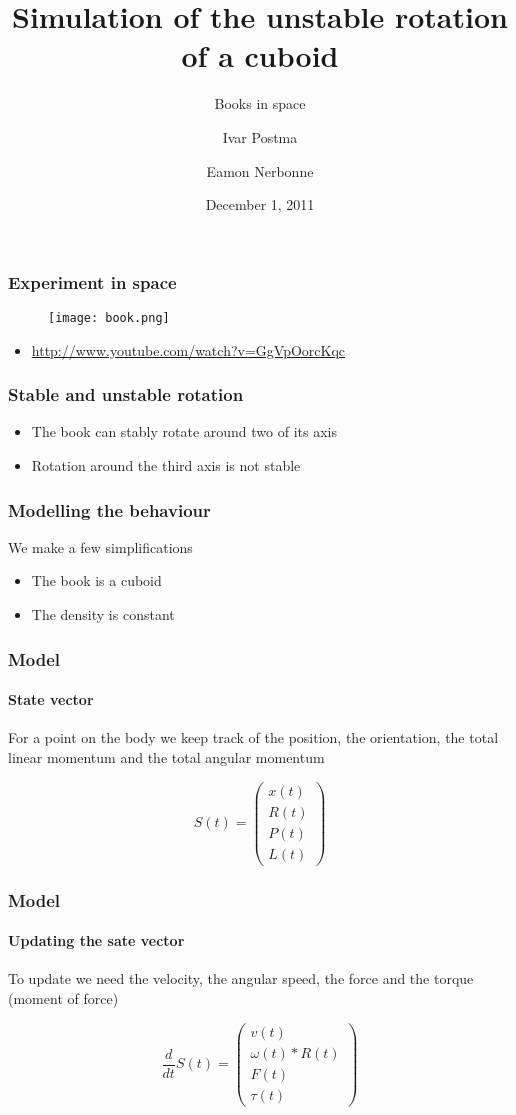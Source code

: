 \documentclass{beamer}
\title{Simulation of the unstable rotation of a cuboid}
\subtitle{Books in space}
\author{Ivar Postma \and Eamon Nerbonne}
\institute[University of Groningen]
{
  Introduction to Computational Science \\
  School for Computing and Cognition \\
  University of Groningen
}
\date{December 1, 2011}
\begin{document}
\frame{\titlepage}

\begin{frame}
 \frametitle{Experiment in space}
 \begin{figure}
  \centering
  \texttt{[image: book.png]}
 \end{figure}


 \begin{itemize}
  \item \url{http://www.youtube.com/watch?v=GgVpOorcKqc}
 \end{itemize}
\end{frame}

\begin{frame}
 \frametitle{Stable and unstable rotation}
 \begin{itemize}
  \item The book can stably rotate around two of its axis
  \item Rotation around the third axis is not stable
 \end{itemize}
\end{frame}

\begin{frame}
 \frametitle{Modelling the behaviour}
 We make a few simplifications
 \begin{itemize}
  \item The book is a cuboid
  \item The density is constant
 \end{itemize}
\end{frame}

\begin{frame}
 \frametitle{Model}
 \framesubtitle{State vector}
 For a point on the body we keep track of the position, the orientation, the total linear momentum and the total angular momentum

 \begin{displaymath}
  S(t) = \begin{pmatrix}
          x(t) \\
	  R(t) \\
	  P(t) \\
	  L(t)
         \end{pmatrix}
 \end{displaymath}
\end{frame}

\begin{frame}
 \frametitle{Model}
 \framesubtitle{Updating the sate vector}
 To update we need the velocity, the angular speed, the force and the torque (moment of force)

 \begin{displaymath}
  \frac{d}{dt} S(t) = \begin{pmatrix}
          v(t) \\
	  \omega(t) * R(t) \\
	  F(t) \\
	  \tau(t)
         \end{pmatrix}
 \end{displaymath}
\end{frame}
\end{document}
